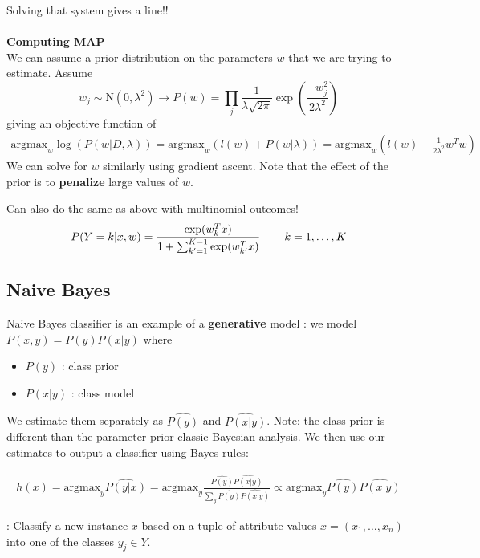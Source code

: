 \documentclass[a4paper]{article}\usepackage[]{graphicx}\usepackage[]{color}
\begin{document}
Solving that system gives a line!!\\
\\
\textbf{Computing MAP}\\
We can assume a prior distribution on the parameters $w$ that we are trying to estimate. Assume 
\begin{equation*} w_j \sim \text{N}(0,\lambda^2) \rightarrow P(w)=\prod_j \frac{1}{\lambda\sqrt{2\pi}}\exp\left(\frac{-w_j^2}{2\lambda^2}\right)\end{equation*}
giving an objective function of
\begin{align*}
\text{argmax}_w \log(P(w|D,\lambda)) = \text{argmax}_w (l(w) + P(w|\lambda)) = \text{argmax}_w \left(l(w) + \frac{1}{2\lambda^2}w^T w\right)
\end{align*}
We can solve for $w$ similarly using gradient ascent. Note that the effect of the prior is to \textbf{penalize} large values of $w$. 

Can also do the same as above with multinomial outcomes!
\begin{align*}
P(Y=k|x,w) = \frac{\exp(w_k^T x)}{1+\sum_{k'=1}^{K-1} \exp(w_{k'}^T x)} \hspace{0.3in} k=1,\ldots,K
\end{align*}

\subsection{Naive Bayes}

Naive Bayes classifier is an example of a \textbf{generative} model : we model $P(x,y)=P(y)P(x|y)$ where
\begin{itemize}
\item $P(y)$ : class prior
\item $P(x|y)$ : class model
\end{itemize}

We estimate them separately as $\hat{P(y)}$ and $\hat{P(x|y)}$. Note: the class prior is different than the parameter prior classic Bayesian analysis. We then use our estimates to output a classifier using Bayes rules:

\begin{align*}
h(x) = \text{argmax}_y \hat{P(y|x)}  = \text{argmax}_y \frac{\hat{P(y)}\hat{P(x|y)}}{\sum_y \hat{P(y)}\hat{P(x|y)}} \propto \text{argmax}_y \hat{P(y)}\hat{P(x|y)}
\end{align*}

: Classify a new instance $x$ based on a tuple of attribute values $x=(x_1,\ldots,x_n)$ into one of the classes $y_j \in Y$. \\
\\
\end{document}
